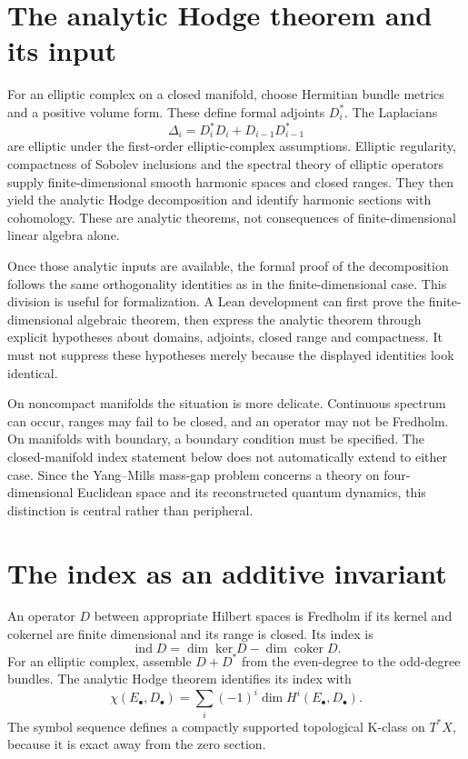 \section{The analytic Hodge theorem and its input}

For an elliptic complex on a closed manifold, choose Hermitian bundle metrics and a positive volume form. These define formal adjoints $D_i^*$. The Laplacians
\[
\Delta_i=D_i^*D_i+D_{i-1}D_{i-1}^*
\]
are elliptic under the first-order elliptic-complex assumptions. Elliptic regularity, compactness of Sobolev inclusions and the spectral theory of elliptic operators supply finite-dimensional smooth harmonic spaces and closed ranges. They then yield the analytic Hodge decomposition and identify harmonic sections with cohomology. These are analytic theorems, not consequences of finite-dimensional linear algebra alone.\cite{v2AS1968I,v2AB1967}

Once those analytic inputs are available, the formal proof of the decomposition follows the same orthogonality identities as in the finite-dimensional case. This division is useful for formalization. A Lean development can first prove the finite-dimensional algebraic theorem, then express the analytic theorem through explicit hypotheses about domains, adjoints, closed range and compactness. It must not suppress these hypotheses merely because the displayed identities look identical.

On noncompact manifolds the situation is more delicate. Continuous spectrum can occur, ranges may fail to be closed, and an operator may not be Fredholm. On manifolds with boundary, a boundary condition must be specified. The closed-manifold index statement below does not automatically extend to either case. Since the Yang--Mills mass-gap problem concerns a theory on four-dimensional Euclidean space and its reconstructed quantum dynamics, this distinction is central rather than peripheral.

\section{The index as an additive invariant}

An operator $D$ between appropriate Hilbert spaces is Fredholm if its kernel and cokernel are finite dimensional and its range is closed. Its index is
\[
\operatorname{ind}D=\dim\ker D-\dim\operatorname{coker}D.
\]
For an elliptic complex, assemble $D+D^*$ from the even-degree to the odd-degree bundles. The analytic Hodge theorem identifies its index with
\[
\chi(E_\bullet,D_\bullet)=\sum_i(-1)^i\dim H^i(E_\bullet,D_\bullet).
\]
The symbol sequence defines a compactly supported topological K-class on $T^*X$, because it is exact away from the zero section.

